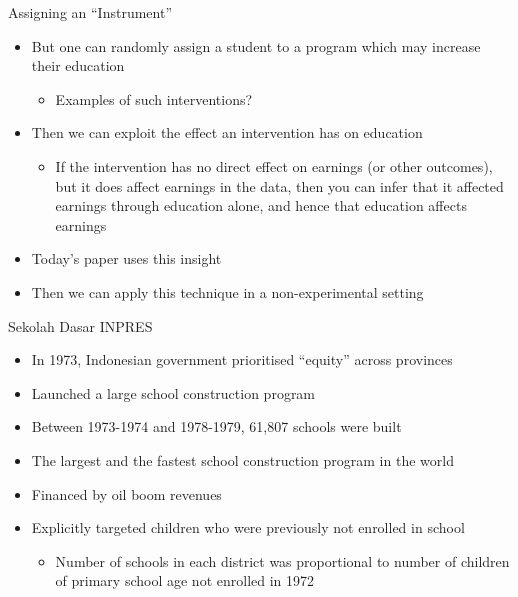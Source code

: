 \documentclass[11pt,notes=hide,aspectratio=169,mathserif]{beamer}
\begin{document}
\begin{frame}{Assigning an ``Instrument''}
\begin{itemize}
\item But one can randomly assign a student to a program which may increase their education 
\begin{itemize}
\item  Examples of such interventions? 
\end{itemize}
\item  Then we can exploit the effect an intervention has on education 
\begin{itemize}
\item  If the intervention has no direct effect on earnings (or other outcomes), but it does affect earnings in the data, then you can infer that it affected earnings through education alone, and hence that education affects earnings 
\end{itemize}
\item  Today's paper uses this insight 
\item  Then we can apply this technique in a non-experimental setting
\end{itemize}
\end{frame}

\begin{frame}{Sekolah Dasar INPRES}
\begin{itemize}
\item In 1973, Indonesian government prioritised ``equity'' across provinces
\item Launched a large school construction program
\item Between 1973-1974 and 1978-1979, 61,807 schools were built
\item The largest and the fastest school construction program in the world
\item Financed by oil boom revenues
\item Explicitly targeted children who were previously not enrolled in school 
    \begin{itemize}
        \item Number of schools in each district was proportional to number of children of primary school age not enrolled in 1972
    \end{itemize}
\end{itemize}
\end{frame}
\end{document}
